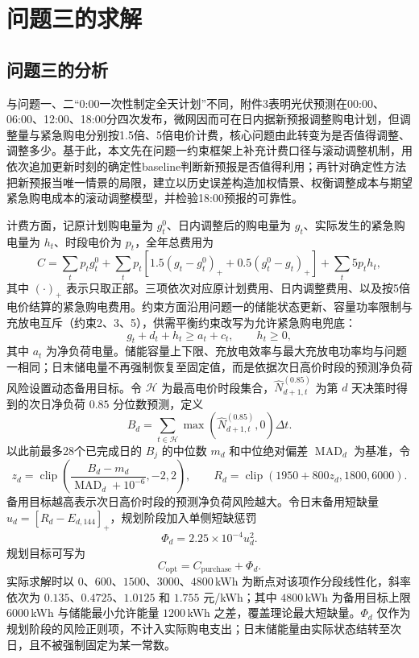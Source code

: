 \section{问题三的求解}

\subsection{问题三的分析}
与问题一、二``0:00一次性制定全天计划''不同，附件3表明光伏预测在00:00、06:00、12:00、18:00分四次发布，微网因而可在日内据新预报调整购电计划，但调整量与紧急购电分别按1.5倍、5倍电价计费，核心问题由此转变为是否值得调整、调整多少。基于此，本文先在问题一约束框架上补充计费口径与滚动调整机制，用依次追加更新时刻的确定性baseline判断新预报是否值得利用；再针对确定性方法把新预报当唯一情景的局限，建立以历史误差构造加权情景、权衡调整成本与期望紧急购电成本的滚动调整模型，并检验18:00预报的可靠性。

计费方面，记原计划购电量为 $g_t^0$、日内调整后的购电量为 $g_t$、实际发生的紧急购电量为 $h_t$、时段电价为 $p_t$，全年总费用为
\begin{equation}
C=\sum_t p_tg_t^0+\sum_t p_t\left[1.5(g_t-g_t^0)_++0.5(g_t^0-g_t)_+\right]+\sum_t5p_th_t,
\end{equation}
其中 $(\cdot)_+$ 表示只取正部。三项依次对应原计划费用、日内调整费用、以及按5倍电价结算的紧急购电费用。约束方面沿用问题一的储能状态更新、容量功率限制与充放电互斥（约束2、3、5），供需平衡约束改写为允许紧急购电兜底：
\begin{equation}
g_t+d_t+h_t\ge a_t+c_t,\qquad h_t\ge0,
\end{equation}
其中 $a_t$ 为净负荷电量。储能容量上下限、充放电效率与最大充放电功率均与问题一相同；日末储电量不再强制恢复至固定值，而是依据次日高价时段的预测净负荷风险设置动态备用目标。令 $\mathcal H$ 为最高电价时段集合，$\widehat N_{d+1,t}^{(0.85)}$ 为第 $d$ 天决策时得到的次日净负荷 $0.85$ 分位数预测，定义
\begin{equation}
B_d=\sum_{t\in\mathcal H}\max\left(\widehat N_{d+1,t}^{(0.85)},0\right)\Delta t.
\end{equation}
以此前最多28个已完成日的 $B_j$ 的中位数 $m_d$ 和中位绝对偏差 $\operatorname{MAD}_d$ 为基准，令
\begin{equation}
z_d=\operatorname{clip}\left(\frac{B_d-m_d}{\operatorname{MAD}_d+10^{-6}},-2,2\right),\qquad R_d=\operatorname{clip}(1950+800z_d,1800,6000).
\end{equation}
备用目标越高表示次日高价时段的预测净负荷风险越大。令日末备用短缺量 $u_d=[R_d-E_{d,144}]_+$，规划阶段加入单侧短缺惩罚
\begin{equation}
\Phi_d=2.25\times10^{-4}u_d^2.
\end{equation}
规划目标可写为
\begin{equation}
C_{\mathrm{opt}}=C_{\mathrm{purchase}}+\Phi_d.
\end{equation}
实际求解时以 $0$、$600$、$1500$、$3000$、$4800$\,kWh 为断点对该项作分段线性化，斜率依次为 $0.135$、$0.4725$、$1.0125$ 和 $1.755$ 元/kWh；其中 $4800$\,kWh 为备用目标上限 $6000$\,kWh 与储能最小允许能量 $1200$\,kWh 之差，覆盖理论最大短缺量。$\Phi_d$ 仅作为规划阶段的风险正则项，不计入实际购电支出；日末储能量由实际状态结转至次日，且不被强制固定为某一常数。

